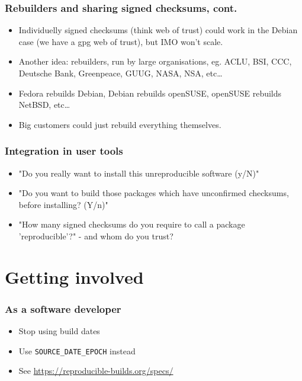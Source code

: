 \documentclass[14pt]{beamer}
\begin{document}
\begin{frame}
 \frametitle{Rebuilders and sharing signed checksums, cont.}
 \begin{itemize}
  \item Individuelly signed checksums (think web of trust) could work in the
  Debian case (we have a gpg web of trust), but IMO won't scale.
  \item { Another idea: rebuilders, run by large organisations,
  eg. ACLU, BSI, CCC, Deutsche Bank, Greenpeace, GUUG, NASA, NSA, etc…}
  \item Fedora rebuilds Debian, Debian rebuilds openSUSE, openSUSE rebuilds
  NetBSD, etc…
  \item Big customers could just rebuild everything themselves.
 \end{itemize}
\end{frame}


\begin{frame}
 \frametitle{Integration in user tools}
 \begin{itemize}
  \item "Do you really want to install this unreproducible software (y/N)"
  \item<2-3> "Do you want to build those packages which have unconfirmed checksums,
  before installing? (Y/n)"
  \item<3>{ "How many signed checksums do you require to call a package
  'reproducible'?" - and whom do you trust?}
 \end{itemize}
\end{frame}


\section{Getting involved}

\begin{frame}
 \frametitle{As a software developer}
 \begin{itemize}
  \item Stop using build dates
  \item Use \texttt{SOURCE\_DATE\_EPOCH} instead
  \item See \url{https://reproducible-builds.org/specs/}
 \end{itemize}
\end{frame}
\end{document}
